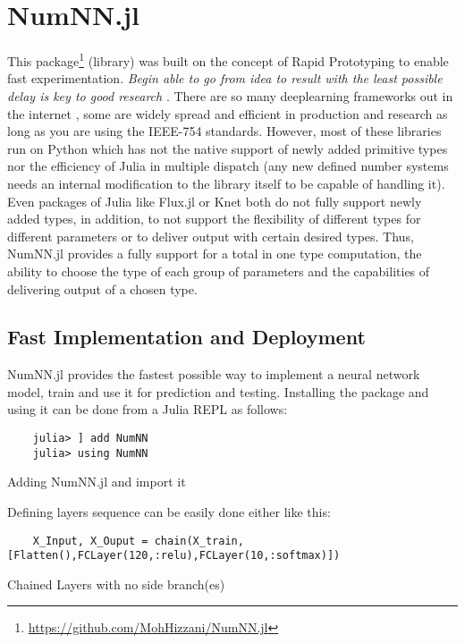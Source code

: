 \section{NumNN.jl}

This package\footnote{\href{https://github.com/MohHizzani/NumNN.jl}{https://github.com/MohHizzani/NumNN.jl}} (library) was built on the concept of Rapid Prototyping to enable fast experimentation. \emph{Begin able to go from idea to result with the least possible delay is key to good research} \cite{Keras}. There are so many deeplearning frameworks out in the internet \cite{Abadi2016,Collet2015,Jia2014,Paszke2017,PyTorch2019}, some are widely spread and efficient in production and research as long as you are using the IEEE-754 standards. However, most of these libraries run on Python which has not the native support of newly added primitive types nor the efficiency of Julia in multiple dispatch (any new defined number systems needs an internal modification to the library itself to be capable of handling it). Even packages of Julia like Flux.jl \cite{Flux.jl-2018,Innes2018} or Knet \cite{Knet} both do not fully support newly added types, in addition, to not support the flexibility of different types for different parameters or to deliver output with certain desired types. Thus, NumNN.jl provides a fully support for a total in one type computation, the ability to choose the type of each group of parameters and the capabilities of delivering output of a chosen type.

\subsection{Fast Implementation and Deployment}

NumNN.jl provides the fastest possible way to implement a neural network model, train and use it for prediction and testing. Installing the package and using it can be done from a Julia REPL as follows:

\begin{listing}[H]
	\begin{verbatim}
	julia> ] add NumNN
	julia> using NumNN
	\end{verbatim}
	\caption{Adding NumNN.jl and import it}\label{addimport}
\end{listing}

Defining layers sequence can be easily done either like this:

\begin{listing}[H]
	\begin{verbatim}
	X_Input, X_Ouput = chain(X_train,[Flatten(),FCLayer(120,:relu),FCLayer(10,:softmax)])
	\end{verbatim}
	\caption{Chained Layers with no side branch(es)}\label{chain}
\end{listing}


